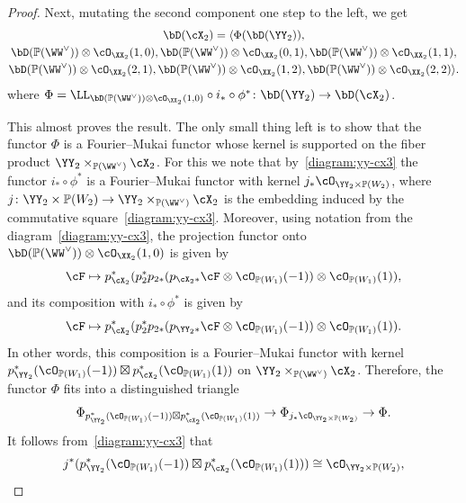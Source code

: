 \documentclass[11pt]{amsart}
\renewcommand{\P}{{\mathbb{P}}}
\theoremstyle{plain}
\theoremstyle{definition}
\theoremstyle{remark}
\begin{document}
\begin{proof}
Next, mutating the second component one step to the left, we get
\begin{multline}\label{eq:dbxx3-2}
\bD({\cX_2}) = \langle \Phi(\bD({\YY_2})), \\
\bD(\P(\WW^\vee)) \otimes \cO_{\XX_2}(1,0),
\bD(\P(\WW^\vee)) \otimes \cO_{\XX_2}(0,1), 
\bD(\P(\WW^\vee)) \otimes \cO_{\XX_2}(1,1), \\
\bD(\P(\WW^\vee)) \otimes \cO_{\XX_2}(2,1), 
\bD(\P(\WW^\vee)) \otimes \cO_{\XX_2}(1,2), 
\bD(\P(\WW^\vee)) \otimes \cO_{\XX_2}(2,2)
\rangle.
\end{multline}
where $\Phi = \LL_{\bD(\P(\WW^\vee)) \otimes \cO_{\XX_2}(1,0)} \circ i_* \circ \phi^* \colon \bD({\YY_2}) \to \bD({\cX_2})$.

This almost proves the result. 
The only small thing left is to show that the functor $\Phi$ is a Fourier--Mukai functor 
whose kernel is supported on the fiber product ${\YY_2} \times_{\P(\WW^\vee)} {\cX_2}$.
For this we note that by~\eqref{diagram:yy-cx3} the functor $i_* \circ \phi^*$ is a Fourier--Mukai functor 
with kernel $j_*\cO_{{\YY_2} \times \P(W_2)}$, 
where $j \colon \YY_2 \times \P(W_2) \to \YY_2 \times_{\P(\WW^\vee)} \cX_2$ is the embedding 
induced by the commutative square~\eqref{diagram:yy-cx3}.
Moreover, using notation from the diagram~\eqref{diagram:yy-cx3}, 
the projection functor onto $\bD(\P(\WW^\vee)) \otimes \cO_{\XX_2}(1,0)$ is given by
\begin{equation*}
\cF \mapsto p_{\cX_2}^*(p_2^*p_{2*}(p_{\cX_2*}\cF \otimes \cO_{\P(W_1)}(-1)) \otimes \cO_{\P(W_1)}(1)),
\end{equation*}
and its composition with $i_* \circ \phi^*$ is given by
\begin{equation*}
\cF \mapsto p_{\cX_2}^*(p_2^*p_{2*}(p_{\YY_2*}\cF \otimes \cO_{\P(W_1)}(-1)) \otimes \cO_{\P(W_1)}(1)).
\end{equation*}
In other words, this composition is a Fourier--Mukai functor with kernel $p_{\YY_2}^*(\cO_{\P(W_1)}(-1)) \boxtimes p_{\cX_2}^*(\cO_{\P(W_1)}(1))$ on $\YY_2 \times_{\P(\WW^\vee)} \cX_2$.
Therefore, the functor $\Phi$ fits into a distinguished triangle
\begin{equation*}
\Phi_{p_{\YY_2}^*(\cO_{\P(W_1)}(-1)) \boxtimes p_{\cX_2}^*(\cO_{\P(W_1)}(1))} \to \Phi_{j_*\cO_{{\YY_2} \times \P(W_2)}} \to \Phi.
\end{equation*}
It follows from~\eqref{diagram:yy-cx3} that 
\begin{equation*}
j^*(p_{\YY_2}^*(\cO_{\P(W_1)}(-1)) \boxtimes p_{\cX_2}^*(\cO_{\P(W_1)}(1))) \cong \cO_{{\YY_2} \times \P(W_2)}, 

\end{equation*}
\end{proof}
\end{document}
